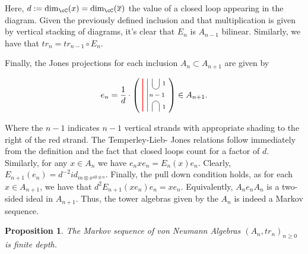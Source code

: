\documentclass[11pt]{article}
\theoremstyle{plain}
\newtheorem{prop}[thm]{Proposition}
\theoremstyle{definition}
\newcommand{\xalt}{x^{\text{alt}\otimes n}}
\begin{document}
Here, $d:=\dim_{\cC}(x)=\dim_{\cC}(\overline{x})$ the value of a closed loop appearing in the diagram. %
Given the previously defined inclusion and that multiplication is given by vertical stacking of diagrams, it's clear that $E_n$ is $A_{n-1}$ bilinear. Similarly, we have that $tr_n=tr_{n-1} \circ E_n$.

Finally, the Jones projections for each inclusion $A_{n}\subset A_{n+1}$ are given by

\begin{equation}\label{eq:JonesProjections}
e_n=
\frac1d\cdot
\left(\,\,
\begin{tikzpicture}[baseline=-.1cm]
	\draw[thick, red] (-.3,-.7) -- (-.3,.7);
	\draw (-.1,-.7) -- (-.1,.7);
	\draw (.1,-.7) -- (.1,-.4) arc (180:0:.15cm) -- (.4,-.7);
	\draw (.1,.7) -- (.1,.4) arc (-180:0:.15cm) -- (.4,.7);
	\node at (.3,0) {\scriptsize{$n-1$}};
	\node at (.6,.5) {\scriptsize{$1$}};
	\node at (.6,-.5) {\scriptsize{$1$}};
\end{tikzpicture}
\right)
\in
A_{n+1}.
\end{equation}

Where the $n-1$ indicates $n-1$ vertical strands with appropriate shading to the right of the red strand. The Temperley-Lieb- %
Jones relations follow immediately from the definition and the fact that closed loops count for a factor of $d$. Similarly, 
for any $x\in A_n$ we have $e_nxe_n=E_n(x)e_n$. Clearly, $E_{n+1}(e_n)=d^{-2}id_{m \otimes \xalt}$. Finally, the pull 
down condition %
holds, as for each $x\in A_{n+1}$, we have that $d^2 E_{n+1}(xe_n)e_n=xe_n$. Equivalently, $A_{n} e_n A_n$ is a 
two-sided ideal in $A_{n+1}$. Thus, the tower algebras given by the $A_n$ is indeed a Markov sequence.
 
\begin{prop}
The Markov sequence of von Neumann Algebras $(A_n, tr_n)_{n\geq 0}$ is finite depth.
\end{prop}
\end{document}

